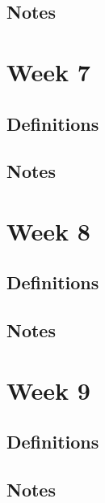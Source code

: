 \documentclass[12pt]{article}
\begin{document}
\subsection{Notes}





\section{Week 7}

\subsection{Definitions}
\subsection{Notes}




\section{Week 8}

\subsection{Definitions}
\subsection{Notes}





\section{Week 9}

\subsection{Definitions}
\subsection{Notes}
\end{document}
